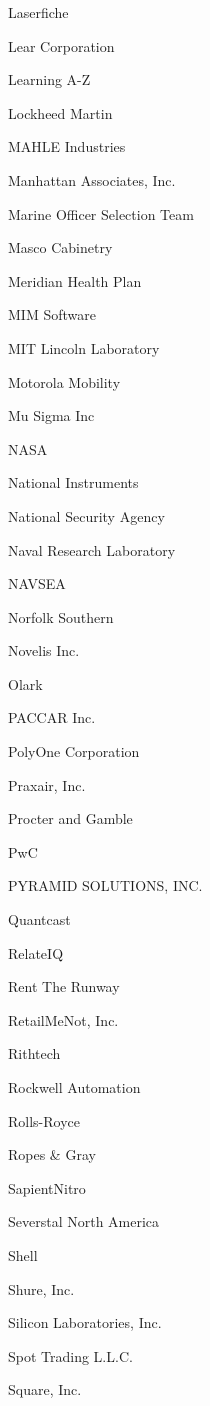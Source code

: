 \documentclass[twoside]{article}
\begin{document}
\begin{center}
\begin{multicols}{5}
\begin{FlushLeft}
\begin{compactitem}
\item Laserfiche
\item Lear Corporation
\item Learning A-Z
\item Lockheed Martin
\item MAHLE Industries
\item Manhattan Associates, Inc.
\item Marine Officer Selection Team
\item Masco Cabinetry
\item Meridian Health Plan
\item MIM Software
\item MIT Lincoln Laboratory
\item Motorola Mobility
\item Mu Sigma Inc
\item NASA
\item National Instruments
\item National Security Agency
\item Naval Research Laboratory
\item NAVSEA
\item Norfolk Southern
\item Novelis Inc.
\item Olark
\item PACCAR Inc.
\item PolyOne Corporation
\item Praxair, Inc.
\item Procter and Gamble
\item PwC
\item PYRAMID SOLUTIONS, INC.
\item Quantcast
\item RelateIQ
\item Rent The Runway
\item RetailMeNot, Inc.
\item Rithtech
\item Rockwell Automation
\item Rolls-Royce
\item Ropes \& Gray
\item SapientNitro
\item Severstal North America
\item Shell
\item Shure, Inc.
\item Silicon Laboratories, Inc.
\item Spot Trading L.L.C.
\item Square, Inc.

\end{compactitem}
\end{FlushLeft}
\end{multicols}
\end{center}
\end{document}
